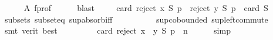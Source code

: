 \begin{isabellebody}
\ \ \ \ \isamarkupfalse%
\ A\ f{\isacharunderscore}{\kern0pt}prof\isanewline
\ \ \ \ \isamarkupfalse%
\ blast\isanewline
\ \ \isamarkupfalse%
\ {}{\isacharcolon}{\kern0pt}\ {\isachardoublequoteopen}card\ {\isacharparenleft}{\kern0pt}{\isacharparenleft}{\kern0pt}reject\ x\ S\ p{\isacharparenright}{\kern0pt}\ {\isasymunion}\ {\isacharparenleft}{\kern0pt}reject\ y\ S\ p{\isacharparenright}{\kern0pt}{\isacharparenright}{\kern0pt}\ {\isacharequal}{\kern0pt}\ card\ S{\isachardoublequoteclose}\isanewline
\ \ \ \ \isamarkupfalse%
\ subsets\ subset{\isacharunderscore}{\kern0pt}eq\ sup{\isachardot}{\kern0pt}absorb{\isacharunderscore}{\kern0pt}iff{}\isanewline
\ \ \ \ \ \ \ \ \ \ sup{\isachardot}{\kern0pt}cobounded{}\ sup{\isacharunderscore}{\kern0pt}left{\isacharunderscore}{\kern0pt}commute\isanewline
\ \ \ \ \isamarkupfalse%
\ {\isacharparenleft}{\kern0pt}smt\ {\isacharparenleft}{\kern0pt}verit{\isacharcomma}{\kern0pt}\ best{\isacharparenright}{\kern0pt}{\isacharparenright}{\kern0pt}\isanewline
\ \ \isamarkupfalse%
\ {}\ {}\isanewline
\ \ \isamarkupfalse%
\ {\isachardoublequoteopen}card\ {\isacharparenleft}{\kern0pt}reject\ {\isacharparenleft}{\kern0pt}x\ {\isasymparallel}\isactrlsub {\isasymup}\ y{\isacharparenright}{\kern0pt}\ S\ p{\isacharparenright}{\kern0pt}\ {\isacharequal}{\kern0pt}\ n{\isachardoublequoteclose}\isanewline
\ \ \ \ \isamarkupfalse%
\ simp\isanewline
{}\isamarkupfalse%
%
\endisatagproof
{\isafoldproof}%
%
\isadelimproof
\isanewline
%
\endisadelimproof
%
\isadelimtheory
\isanewline
%
\endisadelimtheory
%
\isatagtheory
{}\isamarkupfalse%
%
\endisatagtheory
{\isafoldtheory}%
%
\isadelimtheory
%
\endisadelimtheory
%
\end{isabellebody}%
\endinput

